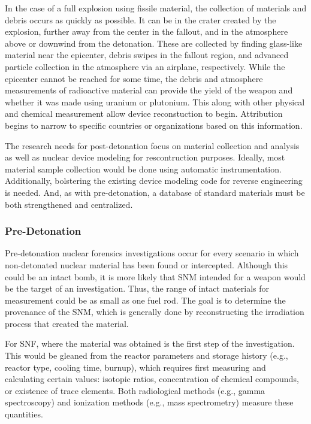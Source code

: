 In the case of a full explosion using fissile material, the collection of
materials and debris occurs as quickly as possible.  It can be in the crater
created by the explosion, further away from the center in the fallout, and in
the atmosphere above or downwind from the detonation. These are collected by
finding glass-like material near the epicenter, debris swipes in the fallout
region, and advanced particle collection in the atmosphere via an airplane,
respectively.  While the epicenter cannot be reached for some time, the debris
and atmosphere measurements of radioactive material can provide the yield of
the weapon and whether it was made using uranium or plutonium. This along with
other physical and chemical measurement allow device reconstuction to begin.
Attribution begins to narrow to specific countries or organizations based on
this information. \cite{aps_aaas_forensics}

The research needs for post-detonation focus on material collection and
analysis as well as nuclear device modeling for rescontruction purposes.
Ideally, most material sample collection would be done using automatic
instrumentation.  Additionally, bolstering the existing device modeling code
for reverse engineering is needed.  And, as with pre-detonation, a database of
standard materials must be both strengthened and centralized.
\cite{aps_aaas_forensics}

\subsubsection{Pre-Detonation}
\label{sec:predet}

Pre-detonation nuclear forensics investigations occur for every scenario in
which non-detonated nuclear material has been found or intercepted. Although
this could be an intact bomb, it is more likely that \gls{SNM} intended
for a weapon would be the target of an investigation. Thus, the range of
intact materials for measurement could be as small as one fuel rod. The goal is to
determine the provenance of the \gls{SNM}, which is generally done by 
reconstructing the irradiation process that created the material. 

For \gls{SNF}, where the material was obtained is the first step of the
investigation. This would be gleaned from the reactor parameters and storage
history (e.g., reactor type, cooling time, burnup), which requires first
measuring and calculating certain values: isotopic ratios, concentration of
chemical compounds, or existence of trace elements.  Both radiological methods
(e.g., gamma spectroscopy) and ionization methods (e.g., mass spectrometry)
measure these quantities.  

